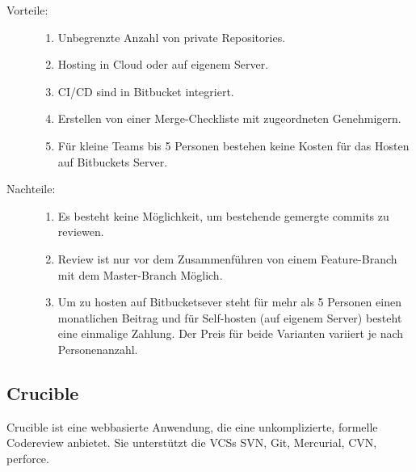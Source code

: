 \begin{description}
	\item [Vorteile:] \hfill
	\begin{enumerate}
		\item Unbegrenzte Anzahl von private Repositories.
		\item Hosting in Cloud oder auf eigenem Server.
		\item \ac{CI}/\ac{CD} sind in Bitbucket integriert.
		\item Erstellen von einer Merge-Checkliste mit zugeordneten Genehmigern.
		\item Für kleine Teams bis 5 Personen bestehen keine Kosten für das Hosten auf Bitbuckets Server.
	\end{enumerate}
	
	\item [Nachteile:] \hfill
	\begin{enumerate}
		\item Es besteht keine Möglichkeit, um bestehende gemergte commits zu reviewen.
		\item Review ist nur vor dem Zusammenführen von einem Feature-Branch mit dem Master-Branch Möglich.
		\item Um zu hosten auf Bitbucketsever steht für mehr als 5 Personen einen monatlichen Beitrag und für Self-hosten (auf eigenem Server) besteht eine einmalige Zahlung. Der 
			Preis für beide Varianten variiert je nach Personenanzahl.
	\end{enumerate}
\end{description}

\subsection{Crucible}
\label{subsec:Crucible}

Crucible ist eine webbasierte Anwendung, die eine unkomplizierte, formelle Codereview anbietet. Sie unterstützt die \acp{VCS} SVN, Git, Mercurial, CVN, perforce.


